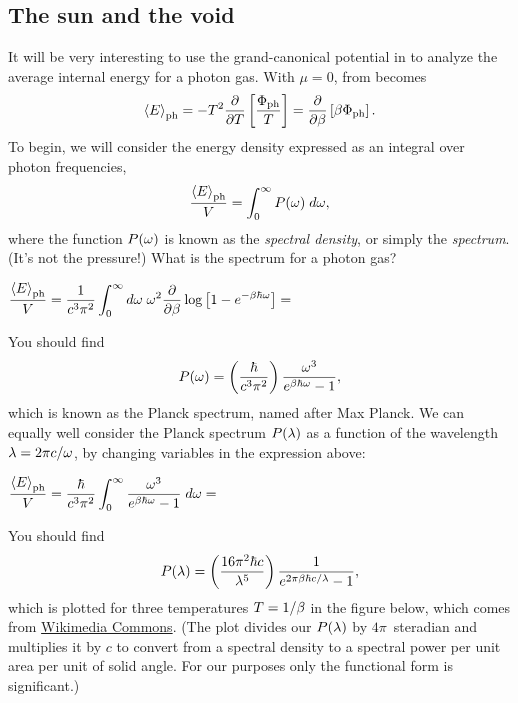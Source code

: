 \subsection{\label{sec:planck}The sun and the void}
It will be very interesting to use the grand-canonical potential in  to analyze the average internal energy for a photon gas.
With $\mu = 0$,  from  becomes
\begin{equation*}
  \left\langle E \right\rangle_{\text{ph}} = -T^2 \frac{\partial }{\partial T} \left[\frac{\Phi_{\text{ph}}}{T}\right] = \frac{\partial }{\partial \beta} \left[\beta \Phi_{\text{ph}}\right].
\end{equation*}
To begin, we will consider the energy density expressed as an integral over photon frequencies,
\begin{equation*}
  \frac{\left\langle E \right\rangle_{\text{ph}}}{V} = \int_0^{\infty} P(\omega) \; d\omega,
\end{equation*}
where the function $P(\omega)$ is known as the \textit{spectral density}, or simply the \textit{spectrum}.
(It's not the pressure!)
What is the spectrum for a photon gas?
\begin{mdframed}
  $\displaystyle \frac{\left\langle E \right\rangle_{\text{ph}}}{V} = \frac{1}{c^3 \pi^2} \int_0^{\infty} d\omega \; \omega^2 \frac{\partial }{\partial \beta} \log\left[1 - e^{-\beta \hbar \omega}\right] = $ \\[120 pt] %
\end{mdframed}

You should find
\begin{equation}
  \label{eq:Planck_omega}
  P(\omega) = \left(\frac{\hbar}{c^3 \pi^2}\right) \frac{\omega^3}{e^{\beta \hbar \omega} - 1},
\end{equation}
which is known as the Planck spectrum, named after Max Planck.
We can equally well consider the Planck spectrum $P(\lambda)$ as a function of the wavelength $\lambda = 2\pi c / \omega$, by changing variables in the expression above:
\begin{mdframed}
  $\displaystyle \frac{\left\langle E \right\rangle_{\text{ph}}}{V} = \frac{\hbar}{c^3 \pi^2} \int_0^{\infty} \frac{\omega^3}{e^{\beta \hbar \omega} - 1} \; d\omega = $ \\[120 pt] %
\end{mdframed}

You should find
\begin{equation}
  \label{eq:Planck_la}
  P(\lambda) = \left(\frac{16\pi^2 \hbar c}{\lambda^5}\right) \frac{1}{e^{2\pi\beta \hbar c / \lambda} - 1},
\end{equation}
which is plotted for three temperatures $T = 1 / \beta$ in the figure below, which comes from \href{https://commons.wikimedia.org/wiki/File:Black_body.svg}{Wikimedia Commons}.
(The plot divides our $P(\lambda)$ by $4\pi$~steradian and multiplies it by $c$ to convert from a spectral density to a spectral power per unit area per unit of solid angle.  For our purposes only the functional form is significant.)

